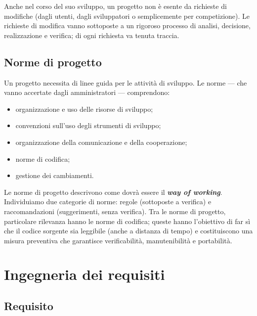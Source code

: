 \documentclass[a4paper]{article}
\begin{document}
		
Anche nel corso del suo sviluppo, un progetto non è esente da richieste di modifiche (dagli utenti, dagli sviluppatori o semplicemente per competizione). Le richieste di modifica vanno sottoposte a un rigoroso processo di analisi, decisione, realizzazione e verifica; di ogni richiesta va tenuta traccia.

		
	\subsection{Norme di progetto}

		
Un progetto necessita di linee guida per le attività di sviluppo. Le norme --- che vanno accertate dagli amministratori --- comprendono:
		
	\begin{itemize}
		
			
	\item organizzazione e uso delle risorse di sviluppo;
			
	\item convenzioni sull'uso degli strumenti di sviluppo;
			
	\item organizzazione della comunicazione e della cooperazione;
			
	\item norme di codifica;
			
	\item gestione dei cambiamenti.
		
	\end{itemize}

		
Le norme di progetto descrivono come dovrà essere il \textbf{\emph{way of working}}. Individuiamo due categorie di norme: regole (sottoposte a verifica) e raccomandazioni (suggerimenti, senza verifica). Tra le norme di progetto, particolare rilevanza hanno le norme di codifica; queste hanno l'obiettivo di far sì che il codice sorgente sia leggibile (anche a distanza di tempo) e costituiscono una misura preventiva che garantisce verificabilità, manutenibilità e portabilità.
	


		
	\section{Ingegneria dei requisiti}


		
	\subsection{Requisito}
\end{document}
